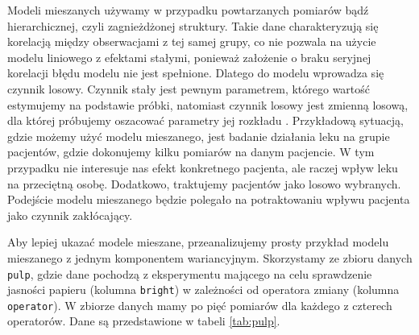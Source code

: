 \documentclass[12pt]{mwbk}
\theoremstyle{plain}
\theoremstyle{definition}
\theoremstyle{remark}
\begin{document}
Modeli mieszanych używamy w przypadku powtarzanych pomiarów bądź hierarchicznej, czyli zagnieżdżonej struktury. Takie dane charakteryzują się korelacją między obserwacjami z tej samej grupy, co nie pozwala na użycie modelu liniowego z efektami stałymi, ponieważ założenie o braku seryjnej korelacji błędu modelu nie jest spełnione. Dlatego do modelu wprowadza się czynnik losowy.  Czynnik stały jest pewnym parametrem, którego wartość estymujemy na podstawie próbki, natomiast czynnik losowy jest zmienną losową, dla której próbujemy oszacować parametry jej rozkładu \cite{faraway}.
Przykładową sytuacją, gdzie możemy użyć modelu mieszanego, jest badanie działania leku na grupie pacjentów, gdzie dokonujemy kilku pomiarów na danym pacjencie. W tym przypadku nie interesuje nas efekt konkretnego pacjenta, ale raczej wpływ leku na przeciętną osobę. Dodatkowo, traktujemy pacjentów jako losowo wybranych. Podejście modelu mieszanego będzie polegało na potraktowaniu wpływu pacjenta jako czynnik zakłócający. 






Aby lepiej ukazać modele mieszane, przeanalizujemy prosty przykład modelu mieszanego z jednym komponentem wariancyjnym. Skorzystamy ze zbioru danych \texttt{pulp}, gdzie dane pochodzą z eksperymentu mającego na celu sprawdzenie jasności papieru (kolumna \texttt{bright}) w zależności od operatora zmiany (kolumna \texttt{operator}). W zbiorze danych mamy po pięć pomiarów dla każdego z czterech operatorów. Dane są przedstawione w tabeli \ref{tab:pulp}.
\end{document}
